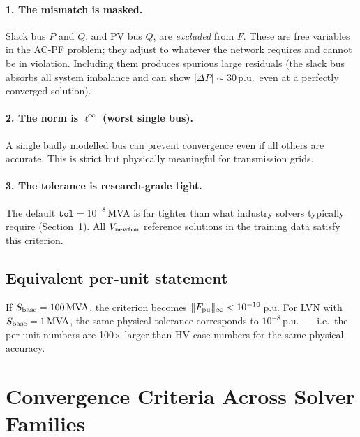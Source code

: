 \documentclass{article}
\begin{document}
\paragraph{1. The mismatch is masked.}
Slack bus $P$ and $Q$, and PV bus $Q$, are \emph{excluded} from $F$.
These are free variables in the AC-PF problem; they adjust to whatever
the network requires and cannot be in violation.  Including them produces
spurious large residuals (the slack bus absorbs all system imbalance and
can show $|\Delta P| \sim 30$\,p.u.\ even at a perfectly converged
solution).

\paragraph{2. The norm is $\ell^\infty$ (worst single bus).}
A single badly modelled bus can prevent convergence even if all others
are accurate.  This is strict but physically meaningful for transmission
grids.

\paragraph{3. The tolerance is research-grade tight.}
The default $\texttt{tol} = 10^{-8}$\,MVA is far tighter than what
industry solvers typically require (Section~\ref{sec:other}).  All
$V_{\rm newton}$ reference solutions in the training data satisfy this
criterion.

\subsection{Equivalent per-unit statement}

If $S_{\rm base} = 100\,\mathrm{MVA}$, the criterion becomes
$\|F_{\rm pu}\|_\infty < 10^{-10}$\,p.u.  For LVN with
$S_{\rm base} = 1\,\mathrm{MVA}$, the same physical tolerance corresponds
to $10^{-8}$\,p.u.\ --- i.e.\ the per-unit numbers are 100$\times$ larger
than HV case numbers for the same physical accuracy.

\section{Convergence Criteria Across Solver Families}
\label{sec:other}
\end{document}
